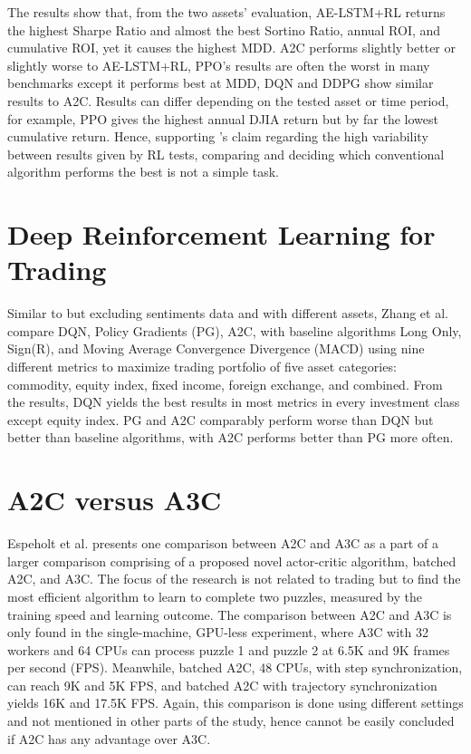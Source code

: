 The results show that, from the two assets' evaluation, AE-LSTM+RL returns the highest Sharpe Ratio and almost the best Sortino Ratio, annual ROI, and cumulative ROI, yet it causes the highest MDD. A2C performs slightly better or slightly worse to AE-LSTM+RL, PPO's results are often the worst in many benchmarks except it performs best at MDD, DQN and DDPG show similar results to A2C. Results can differ depending on the tested asset or time period, for example, PPO gives the highest annual DJIA return but by far the lowest cumulative return. Hence, supporting \cite{LV91}'s claim regarding the high variability between results given by RL tests, comparing and deciding which conventional algorithm performs the best is not a simple task.

\section{Deep Reinforcement Learning for Trading} %
Similar to \cite{LV41} but excluding sentiments data and with different assets, Zhang et al. \cite{LV40} compare DQN, Policy Gradients (PG), A2C, with baseline algorithms Long Only, Sign(R), and Moving Average Convergence Divergence (MACD) using nine different metrics to maximize trading portfolio of five asset categories: commodity, equity index, fixed income, foreign exchange, and combined. From the results, DQN yields the best results in most metrics in every investment class except equity index. PG and A2C comparably perform worse than DQN but better than baseline algorithms, with A2C performs better than PG more often.

\section{A2C versus A3C} %
Espeholt et al. \cite{LV51} presents one comparison between A2C and A3C as a part of a larger comparison comprising of a proposed novel actor-critic algorithm, batched A2C, and A3C. The focus of the research is not related to trading but to find the most efficient algorithm to learn to complete two puzzles, measured by the training speed and learning outcome. The comparison between A2C and A3C is only found in the single-machine, GPU-less experiment, where A3C with 32 workers and 64 CPUs can process puzzle 1 and puzzle 2 at 6.5K and 9K frames per second (FPS). Meanwhile, batched A2C, 48 CPUs, with step synchronization, can reach 9K and 5K FPS, and batched A2C with trajectory synchronization yields 16K and 17.5K FPS. Again, this comparison is done using different settings and not mentioned in other parts of the study, hence cannot be easily concluded if A2C has any advantage over A3C.

